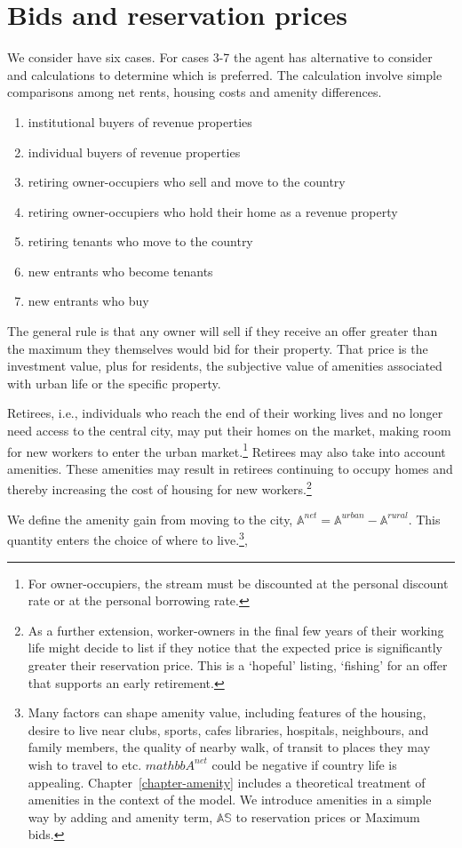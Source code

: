 \chapter{Bids and reservation prices}\label{sec:bids-and-reservation}

We consider have six cases. For cases 3-7 the agent has alternative to consider and calculations to determine which is preferred. The calculation involve simple comparisons among net rents, housing costs and amenity differences. 
\begin{enumerate}
    \item institutional buyers of revenue properties 
    \item individual buyers of revenue properties 
    \item retiring owner-occupiers who sell and move to the country
    \item retiring owner-occupiers who hold their home as a revenue property
    \item retiring tenants who  move to the country
    \item new entrants who become tenants
    \item new entrants who buy
\end{enumerate}


The general rule is that any owner will sell if they receive an offer greater than the maximum they themselves would bid for their property. That price is the investment value,  plus for residents, the subjective value of amenities associated with urban life or the specific property. 

Retirees, i.e., individuals who reach the end of their working lives and no longer need access to the central city, may put their homes on the market, making room for new workers to enter the urban market.\footnote{For owner-occupiers, the stream must be discounted at the personal discount rate or at the personal borrowing rate.}  %
Retirees  may also take into account amenities. These amenities may result in retirees continuing to occupy homes  and thereby increasing the cost of housing for new workers.\footnote{As a further extension, worker-owners in the final few years of their working life might decide to list if they notice that the expected price is significantly greater their reservation price. This is a `hopeful' listing, `fishing' for an offer that supports an early retirement.}


We define the amenity gain from moving to the city, $\mathbb{A}^{net}=\mathbb{A}^{urban}-\mathbb{A}^{rural}$. This quantity enters the choice of where to live.\footnote{ Many factors can shape amenity value, including features of the housing, desire to live near clubs, sports, cafes libraries, hospitals, neighbours, and family members, the quality of nearby walk, of transit to places they may wish to travel to etc. $mathbb{A}^{net}$ could be negative if country life is appealing. Chapter~\ref{chapter-amenity} includes a theoretical treatment of amenities in the context of the model. We introduce amenities in a simple way by adding and amenity term, $\mathbb{AS}$ to reservation prices or Maximum bids.}, 



